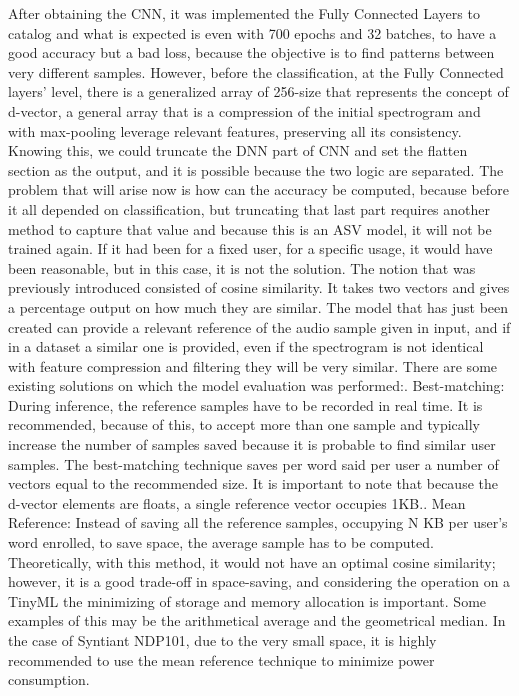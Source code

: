 After obtaining the CNN, it was implemented the Fully Connected Layers to catalog and what is expected is even with 700 epochs and 32 batches, to have a good accuracy but a bad loss, because the objective is to find patterns between very different samples. However, before the classification, at the Fully Connected layers' level, there is a generalized array of 256-size that represents the concept of d-vector, a general array that is a compression of the initial spectrogram and with max-pooling leverage relevant features, preserving all its consistency. Knowing this, we could truncate the DNN part of CNN and set the flatten section as the output, and it is possible because the two logic are separated.\newline
The problem that will arise now is how can the accuracy be computed, because before it all depended on classification, but truncating that last part requires another method to capture that value and because this is an ASV model, it will not be trained again. If it had been for a fixed user, for a specific usage, it would have been reasonable, but in this case, it is not the solution. The notion that was previously introduced consisted of cosine similarity. It takes two vectors and gives a percentage output on how much they are similar. The model that has just been created can provide a relevant reference of the audio sample given in input, and if in a dataset a similar one is provided, even if the spectrogram is not identical with feature compression and filtering they will be very similar. There are some existing solutions on which the model evaluation was performed:. Best-matching: During inference, the reference samples have to be recorded in real time. It is recommended, because of this, to accept more than one sample and typically increase the number of samples saved because it is probable to find similar user samples. The best-matching technique saves per word said per user a number of vectors equal to the recommended size. It is important to note that because the d-vector elements are floats, a single reference vector occupies 1KB.. Mean Reference: Instead of saving all the reference samples, occupying N KB per user's word enrolled, to save space, the average sample has to be computed. Theoretically, with this method, it would not have an optimal cosine similarity; however, it is a good trade-off in space-saving, and considering the operation on a TinyML the minimizing of storage and memory allocation is important. Some examples of this may be the arithmetical average and the geometrical median.\newline
In the case of Syntiant NDP101, due to the very small space, it is highly recommended to use the mean reference technique to minimize power consumption.
